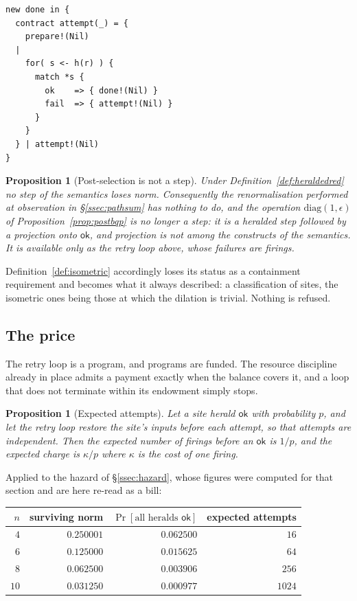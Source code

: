 \documentclass[11pt,a4paper]{article}
\theoremstyle{plain}
\newtheorem{proposition}[theorem]{Proposition}
\theoremstyle{definition}
\theoremstyle{remark}
\begin{document}
\begin{lstlisting}
new done in {
  contract attempt(_) = {
    prepare!(Nil)
  |
    for( s <- h(r) ) {
      match *s {
        ok    => { done!(Nil) }
        fail  => { attempt!(Nil) }
      }
    }
  } | attempt!(Nil)
}
\end{lstlisting}

\begin{proposition}[Post-selection is not a step]\label{prop:nopostsel}
Under Definition~\ref{def:heraldedred} no step of the semantics loses norm.
Consequently the renormalisation performed at observation in
\S\ref{ssec:pathsum} has nothing to do, and the operation
$\mathrm{diag}(1,\epsilon)$ of Proposition~\ref{prop:postbqp} is no longer a
step: it is a heralded step followed by a projection onto $\mathsf{ok}$, and
projection is not among the constructs of the semantics. It is available only as
the retry loop above, whose failures are firings.
\end{proposition}

Definition~\ref{def:isometric} accordingly loses its status as a containment
requirement and becomes what it always described: a classification of sites, the
isometric ones being those at which the dilation is trivial. Nothing is refused.

\subsection{The price}\label{ssec:price}

The retry loop is a program, and programs are funded. The resource discipline
already in place admits a payment exactly when the balance covers it, and a loop
that does not terminate within its endowment simply stops.

\begin{proposition}[Expected attempts]\label{prop:attempts}
Let a site herald $\mathsf{ok}$ with probability $p$, and let the retry loop
restore the site's inputs before each attempt, so that attempts are independent.
Then the expected number of firings before an $\mathsf{ok}$ is $1/p$, and the
expected charge is $\kappa/p$ where $\kappa$ is the cost of one firing.
\end{proposition}

Applied to the hazard of \S\ref{ssec:hazard}, whose figures were computed for
that section and are here re-read as a bill:

\begin{center}
\begin{tabular}{@{}rrrr@{}}
\toprule
$n$ & surviving norm & $\Pr[\text{all heralds } \mathsf{ok}]$ & expected attempts \\
\midrule
$4$  & $0.250001$ & $0.062500$ & $16$ \\
$6$  & $0.125000$ & $0.015625$ & $64$ \\
$8$  & $0.062500$ & $0.003906$ & $256$ \\
$10$ & $0.031250$ & $0.000977$ & $1024$ \\
\bottomrule
\end{tabular}
\end{center}
\end{document}
